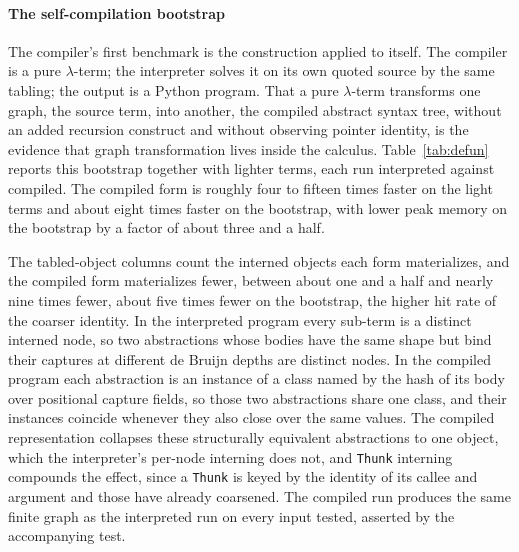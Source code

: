 \paragraph{The self-compilation bootstrap}
The compiler's first benchmark is the construction applied to itself. The compiler is a pure $\lambda$-term; the interpreter solves it on its own quoted source by the same tabling; the output is a Python program. That a pure $\lambda$-term transforms one graph, the source term, into another, the compiled abstract syntax tree, without an added recursion construct and without observing pointer identity, is the evidence that graph transformation lives inside the calculus. Table~\ref{tab:defun} reports this bootstrap together with lighter terms, each run interpreted against compiled. The compiled form is roughly four to fifteen times faster on the light terms and about eight times faster on the bootstrap, with lower peak memory on the bootstrap by a factor of about three and a half.

\begin{table}
  \caption{Interpreted versus compiled execution. Each row runs one application interpreted (interned
    term nodes) against compiled (interned \texttt{Thunk}s and closures). \emph{Speedup}, \emph{memory
  ratio}, and \emph{tabled ratio} compare interpreted to compiled; a ratio above one means the compiled form wins. Time and peak memory are a single measured snapshot, and the compiled column runs the program already compiled, so compilation time is excluded. The last row is the compiler compiling its own source.}
  \label{tab:defun}
  \centering\footnotesize
  \setlength{\tabcolsep}{4pt}
  \resizebox{\textwidth}{!}{}
\end{table}

The tabled-object columns count the interned objects each form materializes, and the compiled form materializes fewer, between about one and a half and nearly nine times fewer, about five times fewer on the bootstrap, the higher hit rate of the coarser identity. In the interpreted program every sub-term is a distinct interned node, so two abstractions whose bodies have the same shape but bind their captures at different de Bruijn depths are distinct nodes. In the compiled program each abstraction is an instance of a class named by the hash of its body over positional capture fields, so those two abstractions share one class, and their instances coincide whenever they also close over the same values. The compiled representation collapses these structurally equivalent abstractions to one object, which the interpreter's per-node interning does not, and \texttt{Thunk} interning compounds the effect, since a \texttt{Thunk} is keyed by the identity of its callee and argument and those have already coarsened. The compiled run produces the same finite graph as the interpreted run on every input tested, asserted by the accompanying test.

